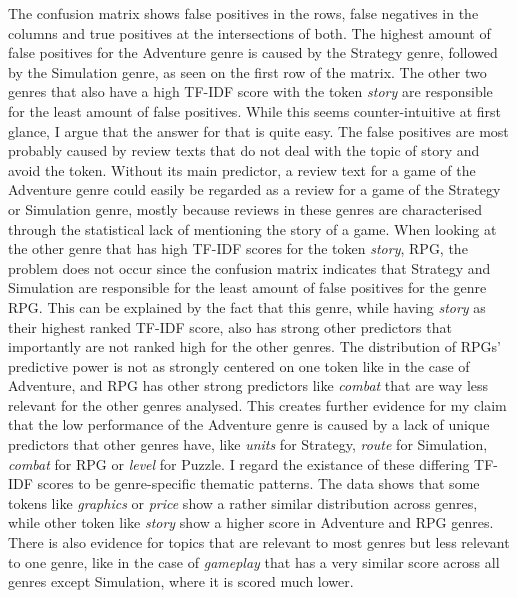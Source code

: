 \documentclass[11pt, a4paper]{article}
\begin{document}
The confusion matrix shows false positives in the rows, false negatives in the columns and true positives at the
intersections of both.
The highest amount of false positives for the Adventure genre is caused by the Strategy genre, followed by the
Simulation genre, as seen on the first row of the matrix.
The other two genres that also have a high TF-IDF score with the token \textit{story} are responsible for the least
amount of false positives.
While this seems counter-intuitive at first glance, I argue that the answer for that is quite easy.
The false positives are most probably caused by review texts that do not deal with the topic of story and avoid the
token.
Without its main predictor, a review text for a game of the Adventure genre could easily be regarded as a review for
a game of the Strategy or Simulation genre, mostly because reviews in these genres are characterised through the
statistical lack of mentioning the story of a game.
When looking at the other genre that has high TF-IDF scores for the token \textit{story}, RPG, the problem does not
occur since the confusion matrix indicates that Strategy and Simulation are responsible for the least amount of false
positives for the genre RPG.
This can be explained by the fact that this genre, while having \textit{story} as their highest ranked TF-IDF score,
also has strong other predictors that importantly are not ranked high for the other genres.
The distribution of RPGs' predictive power is not as strongly centered on one token like in the case
of Adventure, and RPG has other strong predictors like \textit{combat} that are way less relevant for the other genres
analysed.
This creates further evidence for my claim that the low performance of the Adventure genre is caused by a lack of unique
predictors that other genres have, like \textit{units} for Strategy, \textit{route} for Simulation, \textit{combat} for
RPG or \textit{level} for Puzzle.
I regard the existance of these differing TF-IDF scores to be genre-specific thematic patterns.
The data shows that some tokens like \textit{graphics} or \textit{price} show a rather similar
distribution across genres, while other token like \textit{story} show a higher score in Adventure and RPG genres.
There is also evidence for topics that are relevant to most genres but less relevant to one genre, like in the case of
\textit{gameplay} that has a very similar score across all genres except Simulation, where it is scored much
lower.
\end{document}
